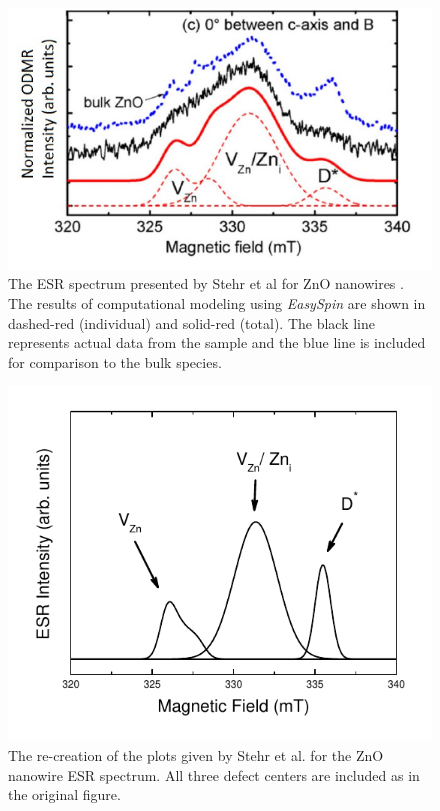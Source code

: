 \documentclass[oneside, noacknowlegments]{BYUPhys}
\begin{document}
\begin{figure}[h]
    \centerline{\includegraphics{stehr_fig}}
    \caption[ESR Spectrum Presented by Stehr et al.]{\label{fig:StehrPlots}
     The ESR spectrum presented by Stehr et al for ZnO nanowires \cite{RefWorks:doc:58929128e4b0228a292928a7}. The results of computational modeling using \textit{EasySpin} are shown in dashed-red (individual) and solid-red (total). The black line represents actual data from the sample and the blue line is included for comparison to the bulk species.}
 \end{figure}

\begin{figure}[h]
    \centerline{\includegraphics{stehr_rec_fig}}
    \caption[Recreation of ZnO Nanowire ESR]{\label{fig:StehrRec}
     The re-creation of the plots given by Stehr et al. for the ZnO nanowire ESR spectrum. All three defect centers are included as in the original figure. }
 \end{figure}
 
\end{document}
